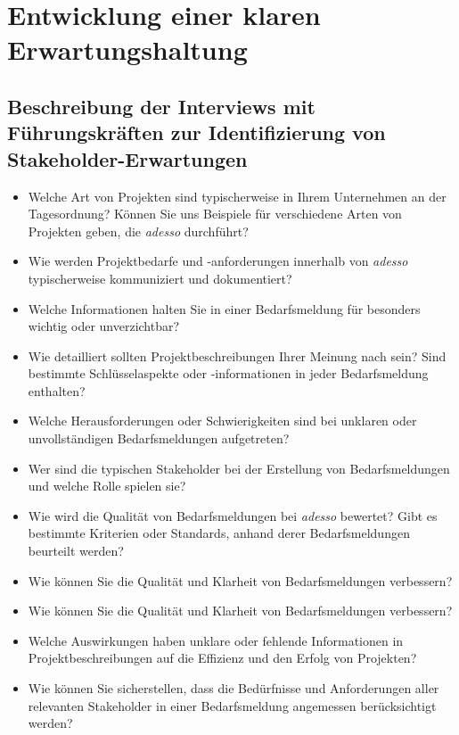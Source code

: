 \chapter{Entwicklung einer klaren Erwartungshaltung}
\label{chap:erwartungshaltung}

\section{Beschreibung der Interviews mit Führungskräften zur Identifizierung von Stakeholder-Erwartungen}
\label{sec:beschreibung-der-interviews}

\begin{itemize}
	\item Welche Art von Projekten sind typischerweise in Ihrem Unternehmen an der Tagesordnung? Können Sie uns Beispiele für verschiedene Arten von Projekten geben, die \emph{adesso} durchführt?
	\item Wie werden Projektbedarfe und -anforderungen innerhalb von \emph{adesso} typischerweise kommuniziert und dokumentiert?
	\item Welche Informationen halten Sie in einer Bedarfsmeldung für besonders wichtig oder unverzichtbar?
	\item Wie detailliert sollten Projektbeschreibungen Ihrer Meinung nach sein? Sind bestimmte Schlüsselaspekte oder -informationen in jeder Bedarfsmeldung enthalten?
	\item Welche Herausforderungen oder Schwierigkeiten sind bei unklaren oder unvollständigen Bedarfsmeldungen aufgetreten?
	\item Wer sind die typischen Stakeholder bei der Erstellung von Bedarfsmeldungen und welche Rolle spielen sie?
	\item Wie wird die Qualität von Bedarfsmeldungen bei \emph{adesso} bewertet? Gibt es bestimmte Kriterien oder Standards, anhand derer Bedarfsmeldungen beurteilt werden?
	\item Wie können Sie die Qualität und Klarheit von Bedarfsmeldungen verbessern?
	\item Wie können Sie die Qualität und Klarheit von Bedarfsmeldungen verbessern?
	\item Welche Auswirkungen haben unklare oder fehlende Informationen in Projektbeschreibungen auf die Effizienz und den Erfolg von Projekten?
	\item Wie können Sie sicherstellen, dass die Bedürfnisse und Anforderungen aller relevanten Stakeholder in einer Bedarfsmeldung angemessen berücksichtigt werden?
\end{itemize}

